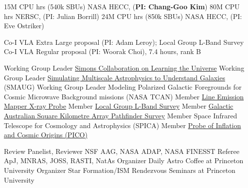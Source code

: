 \documentclass[12pt]{article}
\begin{document}

{15M CPU hrs (540k SBUs)}
{NASA HECC, ({\bf PI: Chang-Goo Kim})}
{80M CPU hrs}
{NERSC, (PI: Julian Borrill)}
{24M CPU hrs (850k SBUs)}
{NASA HECC, (PI: Eve Ostriker)}


{Co-I}
{VLA Extra Large proposal (PI: Adam Leroy); Local Group L-Band Survey}
{Co-I}
{VLA Regular proposal (PI: Woorak Choi), 7.4 hours, rank B}


{Working Group Leader}
{\href{https://www.learning-the-universe.org}{Simons Collaboration on Learning the Universe}}
{Working Group Leader}
{{\href{https://www.simonsfoundation.org/flatiron/center-for-computational-astrophysics/galaxy-formation/smaug/}{Simulating Multiscale Astrophysics to Understand Galaxies} (SMAUG)}}
{Working Group Leader}
{Modeling Polarized Galactic Foregrounds for Cosmic Microwave Background missions (NASA TCAN)}
{Member}
{\href{http://lem.cfa.harvard.edu}{Line Emission Mapper X-ray Probe}}
{Member}
{\href{https://www.lglbs.org}{Local Group L-Band Survey}}
{Member}
{\href{https://gaskap.anu.edu.au}{Galactic Australian Square Kilometre Array Pathfinder Survey}}
{Member}
{Space Infrared Telescope for Cosmology and Astrophysics (SPICA)}
{Member}
{\href{https://zzz.physics.umn.edu/!ipsig/}{Probe of Inflation and Cosmic Origins (PICO)}}


{Review Panelist, Reviewer}
{NSF AAG, NASA ADAP, NASA FINESST}
{Referee}
{ApJ, MNRAS, JOSS, RASTI, NatAs}
{Organizer}
{Daily Astro Coffee at Princeton University}
{Organizer}
{Star Formation/ISM Rendezvous Seminars at Princeton University}
\end{document}
